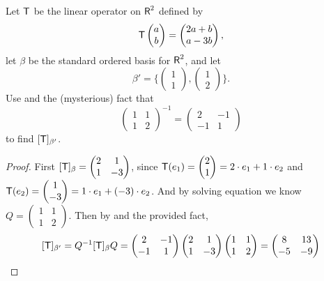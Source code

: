 \begin{exercise} \label{exercise 2.5.4}
Let \(\textsf{T}\) be the linear operator on \(\textsf{R}^2\) defined by
\[
    \textsf{T}\begin{pmatrix} a \\ b \end{pmatrix}
    = \begin{pmatrix} 2a + b \\ a - 3b \end{pmatrix},
\]
let \(\beta\) be the standard ordered basis for \(\textsf{R}^2\), and let
\[
    \beta' = \bigg\{ \begin{pmatrix} 1 \\ 1 \end{pmatrix},
    \begin{pmatrix} 1 \\ 2 \end{pmatrix} \bigg\}.
\]
Use  and the (mysterious) fact that
\[
    \begin{pmatrix} 1 & 1 \\ 1 & 2 \end{pmatrix}^{-1} =
    \begin{pmatrix} 2 & -1 \\ -1 & 1 \end{pmatrix}
\]
to find \([\textsf{T}]_{\beta'}\).
\end{exercise}

\begin{proof}
First \([\textsf{T}]_{\beta} = \begin{pmatrix} 2 & 1 \\ 1 & -3 \end{pmatrix}\), since \(\textsf{T}(e_1) = \begin{pmatrix} 2 \\ 1 \end{pmatrix}= 2 \cdot e_1 + 1 \cdot e_2\) and \(\textsf{T}(e_2) = \begin{pmatrix} 1 \\ -3 \end{pmatrix} = 1 \cdot e_1 + (-3) \cdot e_2\).
And by solving equation we know \(Q = \begin{pmatrix} 1 & 1 \\ 1 & 2 \end{pmatrix}\).
Then by  and the provided fact,
\[
    [\textsf{T}]_{\beta'} = Q^{-1} [\textsf{T}]_{\beta} Q =
    \begin{pmatrix} 2 & -1 \\ -1 & 1 \end{pmatrix}
    \begin{pmatrix} 2 & 1 \\ 1 & -3 \end{pmatrix}
    \begin{pmatrix} 1 & 1 \\ 1 & 2 \end{pmatrix}
    = \begin{pmatrix} 8 & 13 \\ -5 & -9 \end{pmatrix}
\]
\end{proof}

